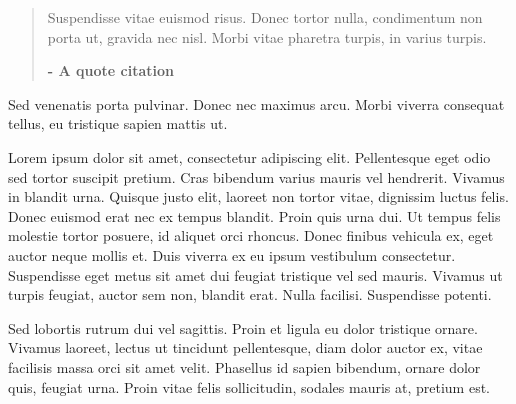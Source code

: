 \documentclass{article}
\begin{document}
\begin{quote}



Suspendisse vitae euismod risus. Donec tortor nulla, condimentum non porta ut, gravida nec nisl. Morbi vitae pharetra turpis, in varius turpis.  


\textbf{- A quote citation}


\end{quote}


Sed venenatis porta pulvinar. Donec nec maximus arcu. Morbi viverra consequat tellus, eu tristique sapien mattis ut.


Lorem ipsum dolor sit amet, consectetur adipiscing elit. Pellentesque eget odio sed tortor suscipit pretium. Cras bibendum varius mauris vel hendrerit. Vivamus in blandit urna. Quisque justo elit, laoreet non tortor vitae, dignissim luctus felis. Donec euismod erat nec ex tempus blandit. Proin quis urna dui. Ut tempus felis molestie tortor posuere, id aliquet orci rhoncus. Donec finibus vehicula ex, eget auctor neque mollis et. Duis viverra ex eu ipsum vestibulum consectetur. Suspendisse eget metus sit amet dui feugiat tristique vel sed mauris. Vivamus ut turpis feugiat, auctor sem non, blandit erat. Nulla facilisi. Suspendisse potenti.


Sed lobortis rutrum dui vel sagittis. Proin et ligula eu dolor tristique ornare. Vivamus laoreet, lectus ut tincidunt pellentesque, diam dolor auctor ex, vitae facilisis massa orci sit amet velit. Phasellus id sapien bibendum, ornare dolor quis, feugiat urna. Proin vitae felis sollicitudin, sodales mauris at, pretium est. 


\printbibliography[title={Bibliography}]
\end{document}
